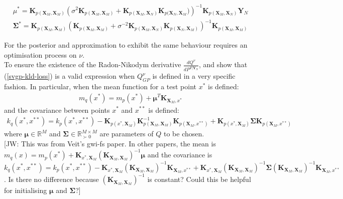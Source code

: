 \documentclass{article}
\newcommand{\jw}[1]{{\color{gray} [JW: #1]}}
\numberwithin{equation}{section}
\begin{document}
\begin{align}
    \label{svgp-optimal-mean}
    \mu^* = \mathbf{K}_{p(\mathbf{X}_M, \mathbf{X}_M)} \left( \sigma^2 \mathbf{K}_{p(\mathbf{X}_M, \mathbf{X}_M)} + \mathbf{K}_{p(\mathbf{X}_M, \mathbf{X}_N)}\mathbf{K}_{p(\mathbf{X}_N, \mathbf{X}_M})\right)^{-1}\mathbf{K}_{p(\mathbf{X}_M, \mathbf{X}_N)} \mathbf{Y}_N\\
    \label{svgp-optimal-covariance}
    \mathbf{\Sigma}^* = \mathbf{K}_{p(\mathbf{X}_M, \mathbf{X}_M)} \left(\mathbf{K}_{p(\mathbf{X}_M, \mathbf{X}_M)} +  \sigma^{-2}\mathbf{K}_{p(\mathbf{X}_M, \mathbf{X}_N)}\mathbf{K}_{p(\mathbf{X}_N, \mathbf{X}_M)}\right)^{-1}\mathbf{K}_{p(\mathbf{X}_M, \mathbf{X}_M)}
\end{align}

For the posterior and approximation to exhibit the same behaviour requires an optimisation process on $\nu$.
\\To ensure the existence of the Radon-Nikodym derivative $\frac{dQ^{\nu}}{d P^{F \vert \mathbf{Y}_N}}$, \cite{matthews2016sparse} and \cite{titsias2009variational} show that (\ref{svgp-kld-loss}) is a valid expression when $Q_{GP}^{\nu}$ is defined in a very specific fashion. In particular, when the mean function for a test point $x^*$ is defined:
\begin{align}
    m_q(x^*) = m_p(x^*) + \mathbf{\mu}^T\mathbf{K}_{\mathbf{X}_M, x^*}
    \label{svgp-mean}
\end{align}
and the covariance between points $x^*$ and $x^{**}$ is defined:
\begin{align}
        k_q(x^*, x^{**}) = k_p(x^*, x^{**}) - \mathbf{K}_{p(x^*, \mathbf{X}_M)} \mathbf{K}_{p(\mathbf{X}_M, \mathbf{X}_M)}^{-1}\mathbf{K}_{p(\mathbf{X}_M, x^{**})} + \mathbf{K}_{p(x^*, \mathbf{X}_M)} \mathbf{\Sigma}\mathbf{K}_{p(\mathbf{X}_M, x^{**})}
    \label{svgp-covariance}
\end{align}
where $\mathbf{\mu} \in \mathbb{R}^{M}$ and $\mathbf{\Sigma} \in \mathbb{R}^{M\times M}_{\succ 0}$ are parameters of $Q$ to be chosen.
\\\jw{This was from Veit's gwi-fs paper. In other papers, the mean is $m_q(x) =  m_p(x^*) + \mathbf{K}_{x^*, \mathbf{X}_M} \left(\mathbf{K}_{\mathbf{X}_M, \mathbf{X}_M}\right)^{-1} \mathbf{\mu}$ and the covariance is $k_q(x^*, x^{**}) = k_p(x^*, x^{**}) - \mathbf{K}_{x^*, \mathbf{X}_M} \left(\mathbf{K}_{\mathbf{X}_M, \mathbf{X}_M}\right)^{-1}\mathbf{K}_{\mathbf{X}_M, x^{**}} + \mathbf{K}_{x^*, \mathbf{X}_M} \left(\mathbf{K}_{\mathbf{X}_M, \mathbf{X}_M}\right)^{-1} \mathbf{\Sigma}\left(\mathbf{K}_{\mathbf{X}_M, \mathbf{X}_M}\right)^{-1}\mathbf{K}_{\mathbf{X}_M, x^{**}}$. Is there no difference because $\left(\mathbf{K}_{\mathbf{X}_M, \mathbf{X}_M}\right)^{-1}$ is constant? Could this be helpful for initialising $\mathbf{\mu}$ and $\mathbf{\Sigma}$?}
\end{document}

